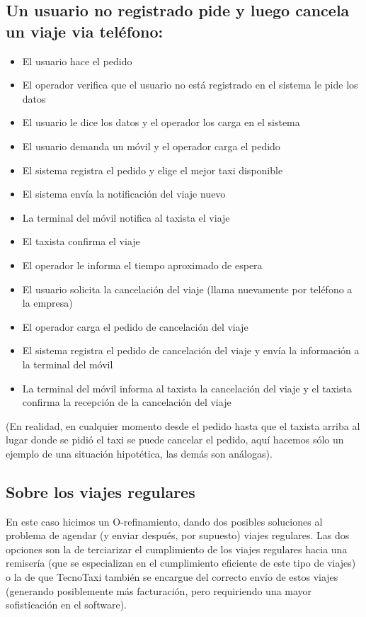 \documentclass[a4paper]{article}
\begin{document}
\subsection{Un usuario no registrado pide y luego cancela un viaje via tel\'efono:}
\begin{itemize}
\item El usuario hace el pedido
\item El operador verifica que el usuario no est\'a registrado en el sistema le pide los datos
\item El usuario le dice los datos y el operador los carga en el sistema
\item El usuario demanda un m\'ovil y el operador carga el pedido
\item El sistema registra el pedido y elige el mejor taxi disponible
\item El sistema env\'ia la notificaci\'on del viaje nuevo
\item La terminal del m\'ovil notifica al taxista el viaje
\item El taxista confirma el viaje
\item El operador le informa el tiempo aproximado de espera
\item El usuario solicita la cancelaci\'on del viaje (llama nuevamente por tel\'efono a la empresa)
\item El operador carga el pedido de cancelaci\'on del viaje
\item El sistema registra el pedido de cancelaci\'on del viaje y env\'ia la informaci\'on a la terminal del m\'ovil
\item La terminal del m\'ovil informa al taxista la cancelaci\'on del viaje y el taxista confirma la recepci\'on de la cancelaci\'on del viaje
\end{itemize}
(En realidad, en cualquier momento desde el pedido hasta que el taxista arriba al lugar donde se pidi\'o el taxi se puede cancelar el pedido, aqu\'i hacemos s\'olo un ejemplo de una situaci\'on hipot\'etica, las dem\'as son an\'alogas).

\subsection{Sobre los viajes regulares}
En este caso hicimos un O-refinamiento, dando dos posibles soluciones al problema de agendar (y enviar despu\'es, por supuesto)
viajes regulares. Las dos opciones son la de terciarizar el cumplimiento de los viajes regulares hacia una remiser\'ia (que se especializan en el cumplimiento eficiente de este tipo de viajes) o la de que TecnoTaxi tambi\'en se encargue del correcto env\'io
de estos viajes (generando posiblemente m\'as facturaci\'on, pero requiriendo una mayor sofisticaci\'on en el software).\\
\end{document}
